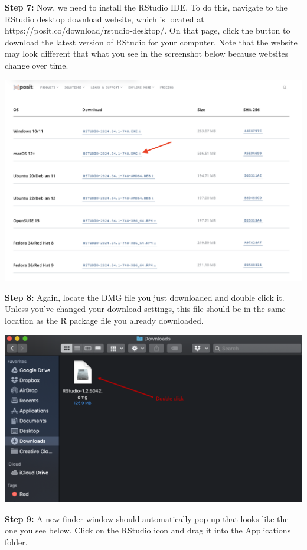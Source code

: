 \documentclass[
  letterpaper,
  DIV=11,
  numbers=noendperiod]{scrreprt}
\begin{document}
\textbf{Step 7:} Now, we need to install the RStudio IDE. To do this,
navigate to the RStudio desktop download website, which is located at
https://posit.co/download/rstudio-desktop/. On that page, click the
button to download the latest version of RStudio for your computer. Note
that the website may look different that what you see in the screenshot
below because websites change over time.

\includegraphics{chapters/installing_r_and_rstudio/mac_download_rstudio1.png}

\textbf{Step 8:} Again, locate the DMG file you just downloaded and
double click it. Unless you've changed your download settings, this file
should be in the same location as the R package file you already
downloaded.

\includegraphics{chapters/installing_r_and_rstudio/mac_install_rstudio1.png}

\textbf{Step 9:} A new finder window should automatically pop up that
looks like the one you see below. Click on the RStudio icon and drag it
into the Applications folder.
\end{document}
